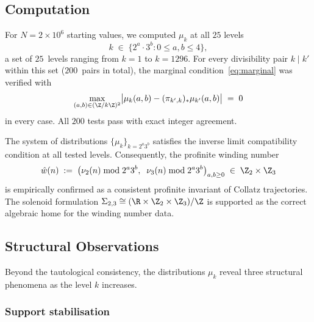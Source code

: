 \subsection{Computation}

\begin{empirical}
\label{obs:profinite-compat}
    For $N = 2 \times 10^6$ starting values, we computed $\mu_k$ at all
    $25$ levels
    \begin{equation}\label{eq:level-set}
        k \;\in\; \bigl\{2^a \cdot 3^b : 0 \leq a, b \leq 4\bigr\},
    \end{equation}
    a set of $25$~levels ranging from $k = 1$ to $k = 1296$.
    For every divisibility pair $k \mid k'$ within this set
    ($200$~pairs in total), the marginal condition~\eqref{eq:marginal}
    was verified with
    \begin{equation}
        \max_{(a,b) \in (\Z/k\Z)^2}
        \bigl|\mu_k(a,b) - (\pi_{k',k})_* \mu_{k'}(a,b)\bigr| \;=\; 0
    \end{equation}
    in every case.  All $200$ tests pass with exact integer agreement.
\end{empirical}

\begin{mainresult}
    The system of distributions $\{\mu_k\}_{k = 2^a 3^b}$ satisfies
    the inverse limit compatibility condition at all tested levels.
    Consequently, the profinite winding number
    \begin{equation}
        \hat{w}(n) \;:=\; \bigl(\nu_2(n) \bmod 2^a 3^b, \;\;
        \nu_3(n) \bmod 2^a 3^b\bigr)_{a,b \geq 0}
        \;\in\; \Z_2 \times \Z_3
    \end{equation}
    is empirically confirmed as a consistent profinite invariant of
    Collatz trajectories.  The solenoid formulation
    $\Sigma_{2,3} \cong (\R \times \Z_2 \times \Z_3)/\Z$ is supported
    as the correct algebraic home for the winding number data.
\end{mainresult}


\subsection{Structural Observations}

Beyond the tautological consistency, the distributions $\mu_k$ reveal
three structural phenomena as the level $k$ increases.

\subsubsection{Support stabilisation}

